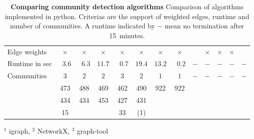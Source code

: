 \newcommand{\mc}[2]{\multicolumn{#1}{c}{#2}}

\begin{table}[htbp]
\caption[Compairing community detection algorithms]{\textbf{Comparing community detection algorithms} Comparison of algorithms implemented in python. Criterias are the support of weighted edges, runtime and number of communities. A runtime indicated by $-$ mean no termination after 15~minutes.\\
}
\label{tab:algos}

\begin{tabular}{laacaaccccccc}
\toprule
	 {} &
	  &
	  &
	  &
	  &
	  &
	 
	  &
	  &
	 
	  &
	  &
	  &
	  &
	  \\ \midrule
	 
	 
	 
	 Edge weights & $\times$ & $\times$ & $\times$ & $\times$ & $\times$ & $\times$ & $\times$ & & $\times$ & $\times$ & $\times$ \\ \midrule
	 Runtime in sec & ~$3.6$ & ~$6.3$ & $11.7$ & ~$0.7$ & $19.4$ & $13.2$ & ~$0.2$ & $-$ & $-$ & $-$ & $-$ & $-$ \\ \midrule
	 Communities & $3$ & $2$ & $2$ & $3$ & $2$ & $1$ & $1$ & $-$ & $-$ & $-$ & $-$ & $-$ \\ \midrule
	  & 473 & 488 & 469 & 462 & 490 & 922 &  922 &  &  &  &  &  \\
	  & 434 & 434 & 453 & 427 & 431 &  &  &  &  &  &  &  \\
	  & 15 &  &  & 33 & (1) &  &  &  &  &  &  &  \\
	 \bottomrule
	 
\end{tabular}
\begin{flushright}
\footnotesize{
$^1$ igraph, $^2$ NetworkX, $^3$ graph-tool\\
}
\end{flushright}

\end{table}

